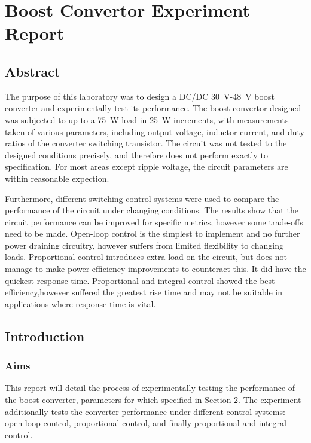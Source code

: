 \section{Boost Convertor Experiment Report}

\subsection{Abstract}

The purpose of this laboratory was to design a DC/DC \qty{30}{\volt}-\qty{48}{\volt} boost converter and experimentally test its performance.
The boost convertor designed was subjected to up to a \qty{75}{\watt} load in \qty{25}{\watt} increments, with measurements taken of various parameters,
including output voltage, inductor current, and duty ratios of the converter switching transistor. 
The circuit was not tested to the designed conditions precisely, and therefore does not perform 
exactly to specification. For most areas except ripple voltage, the circuit parameters are within 
reasonable expection.

Furthermore, different switching control systems were used to compare the 
performance of the circuit under changing conditions. The results show that the circuit 
performance can be improved for specific metrics, however some trade-offs need to be made. Open-loop control
is the simplest to implement and no further power draining circuitry, however suffers from limited 
flexibility to changing loads. Proportional control introduces extra load on the circuit, but does not
manage to make power efficiency improvements to counteract this. It did have the quickest response time.
 Proportional and integral control showed the best efficiency,however suffered the greatest
  rise time and may not be suitable in applications where response time is vital. 

\subsection{Introduction}
\subsubsection{Aims}
This report will detail the process of experimentally testing the performance of the boost converter,
parameters for which specified in \hyperref[sec:specification]{Section 2}.
The experiment additionally tests the converter performance under different control systems: open-loop control,
proportional control, and finally proportional and integral control.

